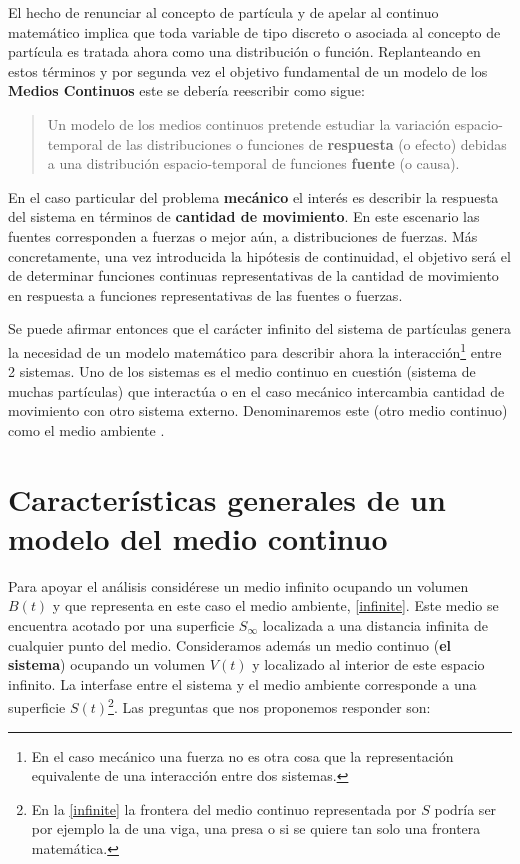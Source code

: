 \documentclass[../notas medios.tex]{subfiles}
\begin{document}
El hecho de renunciar al concepto de partícula y de apelar al continuo 
matemático implica que toda variable de tipo discreto o asociada al concepto de 
partícula es tratada ahora como una distribución o función.  Replanteando en 
estos términos y por segunda vez el objetivo fundamental de un modelo de los 
{\bf Medios Continuos} este se debería reescribir como sigue:
\begin{quote}
Un modelo de los medios continuos pretende estudiar la variación espacio-temporal de las distribuciones o funciones de {\bf respuesta} (o efecto) debidas a una distribución espacio-temporal de funciones {\bf fuente} (o causa).
\end{quote}

En el caso particular del problema {\bf mecánico} el interés es describir la
respuesta del sistema en términos de {\bf cantidad de movimiento}. En este 
escenario las fuentes corresponden a fuerzas o mejor aún, a distribuciones de 
fuerzas. Más concretamente, una vez introducida la hipótesis de continuidad, 
el objetivo será el de determinar funciones continuas representativas de la 
cantidad de movimiento en respuesta a funciones representativas de las fuentes 
o fuerzas.

Se puede afirmar entonces que el carácter infinito del sistema de partículas 
genera la necesidad de un modelo matemático para describir ahora la 
interacción\footnote{En el caso mecánico una fuerza no es otra cosa que la 
representación equivalente de una interacción entre dos sistemas.} entre 2 
sistemas.  Uno de los sistemas es el medio continuo en cuestión (sistema de 
muchas partículas) que interactúa o en el caso mecánico intercambia cantidad de 
movimiento con otro sistema externo.  Denominaremos este (otro medio continuo) 
como el medio ambiente \cite{cadavid2009}.

\section{Características generales de un modelo del medio continuo}
Para apoyar el análisis considérese un medio infinito ocupando un volumen $B(t)$
y que representa en este caso el medio ambiente, \cref{infinite}. Este medio se
encuentra acotado por una superficie ${S_\infty }$ localizada a una distancia 
infinita de cualquier punto del medio.  Consideramos además un medio continuo 
({\bf el sistema}) ocupando un volumen $V(t)$ y localizado al interior de este 
espacio infinito.  La interfase entre el sistema y el medio ambiente 
corresponde a una superficie $S(t)$\footnote{En la \cref{infinite} la frontera 
del medio continuo representada por $S$ podría ser por ejemplo la de una viga, 
una presa o si se quiere tan solo una frontera matemática.}. Las preguntas que 
nos proponemos responder son:
\end{document}
